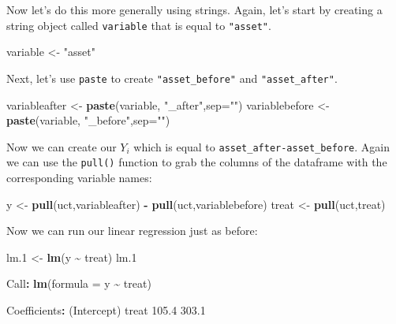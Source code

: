 \documentclass[
]{book}
\newenvironment{Shaded}{\begin{snugshade}}{\end{snugshade}}
\newcommand{\AttributeTok}[1]{\textcolor[rgb]{0.13,0.29,0.53}{#1}}
\newcommand{\FloatTok}[1]{\textcolor[rgb]{0.00,0.00,0.81}{#1}}
\newcommand{\FunctionTok}[1]{\textcolor[rgb]{0.13,0.29,0.53}{\textbf{#1}}}
\newcommand{\NormalTok}[1]{#1}
\newcommand{\OtherTok}[1]{\textcolor[rgb]{0.56,0.35,0.01}{#1}}
\newcommand{\SpecialCharTok}[1]{\textcolor[rgb]{0.81,0.36,0.00}{\textbf{#1}}}
\newcommand{\StringTok}[1]{\textcolor[rgb]{0.31,0.60,0.02}{#1}}
\begin{document}
Now let's do this more generally using strings. Again, let's start by creating a string object called \texttt{variable} that is equal to \texttt{"asset"}.

\begin{Shaded}
\begin{Highlighting}[]
\NormalTok{variable  }\OtherTok{\textless{}{-}} \StringTok{"asset"}
\end{Highlighting}
\end{Shaded}

Next, let's use \texttt{paste} to create \texttt{"asset\_before"} and \texttt{"asset\_after"}.

\begin{Shaded}
\begin{Highlighting}[]
\NormalTok{variableafter }\OtherTok{\textless{}{-}} \FunctionTok{paste}\NormalTok{(variable, }\StringTok{"\_after"}\NormalTok{,}\AttributeTok{sep=}\StringTok{""}\NormalTok{)}
\NormalTok{variablebefore }\OtherTok{\textless{}{-}} \FunctionTok{paste}\NormalTok{(variable, }\StringTok{"\_before"}\NormalTok{,}\AttributeTok{sep=}\StringTok{""}\NormalTok{)}
\end{Highlighting}
\end{Shaded}

Now we can create our \(Y_i\) which is equal to \texttt{asset\_after-asset\_before}. Again we can use the \texttt{pull()} function to grab the columns of the dataframe with the corresponding variable names:

\begin{Shaded}
\begin{Highlighting}[]
\NormalTok{y }\OtherTok{\textless{}{-}} \FunctionTok{pull}\NormalTok{(uct,variableafter) }\SpecialCharTok{{-}} \FunctionTok{pull}\NormalTok{(uct,variablebefore)}
\NormalTok{treat }\OtherTok{\textless{}{-}} \FunctionTok{pull}\NormalTok{(uct,treat)}
\end{Highlighting}
\end{Shaded}

Now we can run our linear regression just as before:

\begin{Shaded}
\begin{Highlighting}[]
\NormalTok{lm}\FloatTok{.1} \OtherTok{\textless{}{-}} \FunctionTok{lm}\NormalTok{(y }\SpecialCharTok{\textasciitilde{}}\NormalTok{ treat)}
\NormalTok{lm}\FloatTok{.1}

\NormalTok{Call}\SpecialCharTok{:}
\FunctionTok{lm}\NormalTok{(}\AttributeTok{formula =}\NormalTok{ y }\SpecialCharTok{\textasciitilde{}}\NormalTok{ treat)}

\NormalTok{Coefficients}\SpecialCharTok{:}
\NormalTok{(Intercept)        treat  }
      \FloatTok{105.4}        \FloatTok{303.1}  
\end{Highlighting}
\end{Shaded}
\end{document}
